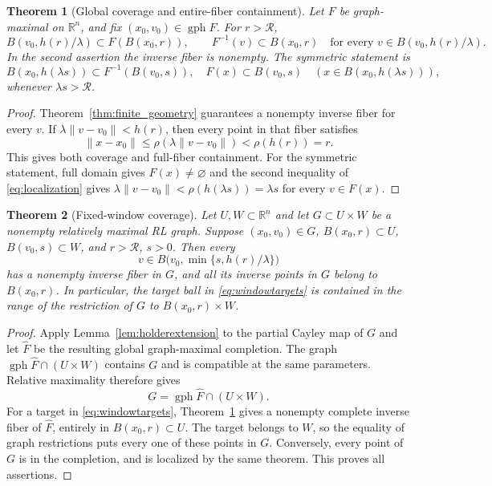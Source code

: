 \documentclass[11pt]{article}
\numberwithin{equation}{section}
\newtheorem{theorem}{Theorem}[section]
\theoremstyle{definition}
\theoremstyle{remark}
\newcommand{\R}{\mathbb R}
\newcommand{\gph}{\operatorname{gph}}
\newcommand{\rad}{\mathcal R}
\newcommand{\norm}[1]{\lVert #1\rVert}
\begin{document}
\begin{theorem}[Global coverage and entire-fiber containment]\label{thm:coverage}
Let $F$ be graph-maximal on $\R^n$, and fix
$(x_0,v_0)\in\gph F$. For $r>\rad$,
\begin{equation}\label{eq:coverage}
 B(v_0,h(r)/\lambda)\subset F(B(x_0,r)),
 \qquad
 F^{-1}(v)\subset B(x_0,r)
 \quad\text{for every }v\in B(v_0,h(r)/\lambda).
\end{equation}
In the second assertion the inverse fiber is nonempty. The symmetric
statement is
\[
 B(x_0,h(\lambda s))\subset F^{-1}(B(v_0,s)),
 \quad F(x)\subset B(v_0,s)
 \quad(x\in B(x_0,h(\lambda s))),
\]
whenever $\lambda s>\rad$.
\end{theorem}

\begin{proof}
Theorem~\ref{thm:finite_geometry} guarantees a nonempty inverse fiber
for every $v$. If $\lambda\norm{v-v_0}<h(r)$, then every point in
that fiber satisfies
\[
 \norm{x-x_0}\le\rho(\lambda\norm{v-v_0})
 <\rho(h(r))=r.
\]
This gives both coverage and full-fiber containment. For the symmetric
statement, full domain gives $F(x)\ne\varnothing$ and the second
inequality of \eqref{eq:localization} gives
$\lambda\norm{v-v_0}<\rho(h(\lambda s))=\lambda s$ for every
$v\in F(x)$.
\end{proof}

\begin{theorem}[Fixed-window coverage]\label{thm:window}
Let $U,W\subset\R^n$ and let $G\subset U\times W$ be a nonempty
relatively maximal RL graph. Suppose $(x_0,v_0)\in G$,
$B(x_0,r)\subset U$, $B(v_0,s)\subset W$, and $r>\rad$, $s>0$.
Then every
\begin{equation}\label{eq:windowtargets}
 v\in B\bigl(v_0,\min\{s,h(r)/\lambda\}\bigr)
\end{equation}
has a nonempty inverse fiber in $G$, and all its inverse points in
$G$ belong to $B(x_0,r)$. In particular, the target ball in
\eqref{eq:windowtargets} is contained in the range of the restriction
of $G$ to $B(x_0,r)\times W$.
\end{theorem}

\begin{proof}
Apply Lemma~\ref{lem:holderextension} to the partial Cayley map of $G$
and let $\widehat F$ be the resulting global graph-maximal completion.
The graph $\gph\widehat F\cap(U\times W)$ contains $G$ and is
compatible at the same parameters. Relative maximality therefore gives
\[
 G=\gph\widehat F\cap(U\times W).
\]
For a target in \eqref{eq:windowtargets},
Theorem~\ref{thm:coverage} gives a nonempty complete inverse fiber of
$\widehat F$, entirely in $B(x_0,r)\subset U$. The target belongs
to $W$, so the equality of graph restrictions puts every one of these
points in $G$. Conversely, every point of $G$ is in the completion,
and is localized by the same theorem. This proves all assertions.
\end{proof}
\end{document}
